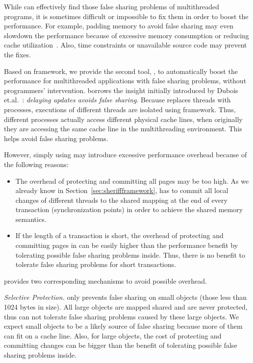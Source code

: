 \label{sec:sheriffprotect}
While \SheriffDetect{} can effectively find those false sharing problems of multithreaded programs, it is sometimes difficult or impossible to fix them in order to boost the performance. For example, padding memory to avoid false sharing may even slowdown the performance because of excessive memory consumption or reducing cache utilization~\cite{qinzhao}. Also, time constraints or unavailable source code may prevent the fixes. 

Based on \sheriff{} framework, we provide the second tool, \SheriffProtect{}, to automatically boost the performance for multithreaded applications with false sharing problems, without programmers' intervention.  \SheriffProtect{} borrows the insight initially introduced by Dubois et.al.~\cite{Dubois:1991:DCE:125826.125941}: {\it delaying updates avoids false sharing}. Because \Sheriff{} replaces threads with processes, executions of different threads are isolated using \sheriff{} framework. Thus, different processes actually access different physical cache lines, when originally they are accessing the same cache line in the multithreading environment. This helps avoid false sharing problems. 

However, simply using \sheriff{} may introduce excessive performance overhead because of the following reasons: 

\begin{itemize}
\item
The overhead of protecting and committing all pages may be too high. As we already know in Section~\ref{sec:sheriffframework}, \sheriff{} has to commit all local changes of different threads  to the shared mapping at the end of every transaction (synchronization points) in order to achieve the shared memory semantics. 

\item
If the length of a transaction is short, the overhead of protecting and committing pages in \sheriff{} can be easily higher than the performance benefit by tolerating possible false sharing problems inside. Thus, there is no benefit to tolerate false sharing problems for short transactions. 

\end{itemize}

\sheriffprotect{} provides two corresponding mechanisms to avoid possible overhead. 

\emph{Selective Protection.} 
\SheriffProtect{} only prevents false sharing on small objects (those less than 1024 bytes in size). All large objects are mapped shared and are never protected, thus can not tolerate false sharing problems caused by these large objects. We expect  small objects to be a likely source of false sharing because more of them can fit on a cache line. Also, for large objects, the cost of protecting and committing changes can be bigger than the benefit of tolerating possible false sharing problems inside. 

